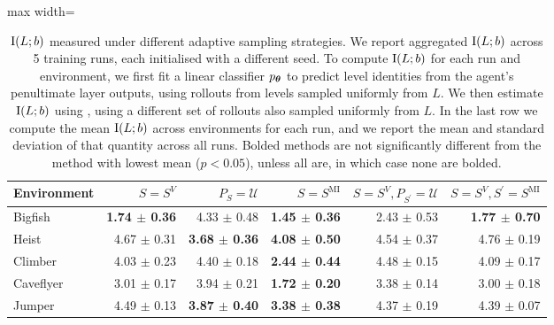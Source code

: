 \begin{table}[!htb]
\caption{$\text{I}(L;b)$ measured under different adaptive sampling strategies. We report aggregated $\text{I}(L;b)$ across 5 training runs, each initialised with a different seed. To compute $\text{I}(L;b)$ for each run and environment, we first fit a linear classifier $p_{\bm{\theta}}$ to predict level identities from the agent's penultimate layer outputs, using rollouts from levels sampled uniformly from $L$. We then estimate $\text{I}(L;b)$ using , using a different set of rollouts also sampled uniformly from $L$. In the last row we compute the mean $\text{I}(L;b)$  across environments for each run, and we report the mean and standard deviation of that quantity across all runs. Bolded methods are not significantly different from the method with lowest mean ($p<0.05$), unless all are, in which case none are bolded.}
\label{c3:tb:procgen_mi}
\vskip 0.15in
\begin{center}
\begin{small}
\begin{sc}
\begin{adjustbox}{max width=\linewidth}
\begin{tabular}{lrrrrr}
\toprule
               Environment &                  $S=S^V$ &        $P_S=\mathcal{U}$ &      $S=S^{\mathrm{MI}}$ & $S=S^V, P_{S^\prime}=\mathcal{U}$ & $S=S^V, S^\prime=S^{\mathrm{MI}}$ \\
\midrule
                   Bigfish & \textbf{1.74 $\pm$ 0.36} &          4.33 $\pm$ 0.48 & \textbf{1.45 $\pm$ 0.36} &                   2.43 $\pm$ 0.53 &          \textbf{1.77 $\pm$ 0.70} \\
                     Heist &          4.67 $\pm$ 0.31 & \textbf{3.68 $\pm$ 0.36} & \textbf{4.08 $\pm$ 0.50} &                   4.54 $\pm$ 0.37 &                   4.76 $\pm$ 0.19 \\
                   Climber &          4.03 $\pm$ 0.23 &          4.40 $\pm$ 0.18 & \textbf{2.44 $\pm$ 0.44} &                   4.48 $\pm$ 0.15 &                   4.09 $\pm$ 0.17 \\
                 Caveflyer &          3.01 $\pm$ 0.17 &          3.94 $\pm$ 0.21 & \textbf{1.72 $\pm$ 0.20} &                   3.38 $\pm$ 0.14 &                   3.00 $\pm$ 0.18 \\
                    Jumper &          4.49 $\pm$ 0.13 & \textbf{3.87 $\pm$ 0.40} & \textbf{3.38 $\pm$ 0.38} &                   4.37 $\pm$ 0.19 &                   4.39 $\pm$ 0.07 \\

\end{tabular}
\end{adjustbox}
\end{sc}
\end{small}
\end{center}
\end{table}
